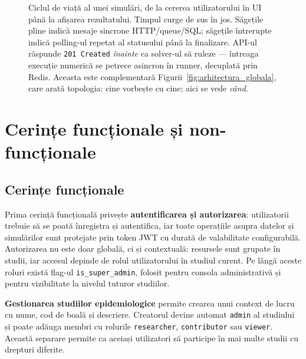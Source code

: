 \begin{figure}[t]
{
}%
\caption[Ciclul de viață al unei simulări]{Ciclul de viață al unei simulări, de la cererea utilizatorului în UI
până la afișarea rezultatului. Timpul curge de sus în jos. Săgețile pline
indică mesaje sincrone HTTP/queue/SQL; săgețile întrerupte indică polling-ul
repetat al statusului până la finalizare. API-ul răspunde \texttt{201 Created}
\emph{înainte} ca solver-ul să ruleze --- întreaga execuție numerică se petrece
asincron în runner, decuplată prin Redis. Aceasta este complementară
Figurii~\ref{fig:arhitectura_globala}, care arată topologia: cine vorbește cu
cine; aici se vede \emph{când}.}
\label{fig:ciclu_viata_simulare}
\end{figure}

\section{Cerințe funcționale și non-funcționale}
\label{sec:cerinte}

\subsection{Cerințe funcționale}
\label{subsec:cerinte_functionale}

Prima cerință funcțională privește \textbf{autentificarea și autorizarea}:
utilizatorii trebuie să se poată înregistra și autentifica, iar toate
operațiile asupra datelor și simulărilor sunt protejate prin token JWT cu
durată de valabilitate configurabilă. Autorizarea nu este doar globală, ci și
contextuală: resursele sunt grupate în studii, iar accesul depinde de rolul
utilizatorului în studiul curent. Pe lângă aceste roluri există flag-ul
\texttt{is\_super\_admin}, folosit pentru consola administrativă și pentru
vizibilitate la nivelul tuturor studiilor.

\textbf{Gestionarea studiilor epidemiologice} permite crearea unui context de
lucru cu nume, cod de boală și descriere. Creatorul devine automat
\texttt{admin} al studiului și poate adăuga membri cu rolurile
\texttt{researcher}, \texttt{contributor} sau \texttt{viewer}. Această
separare permite ca aceiași utilizatori să participe în mai multe studii cu
drepturi diferite.

